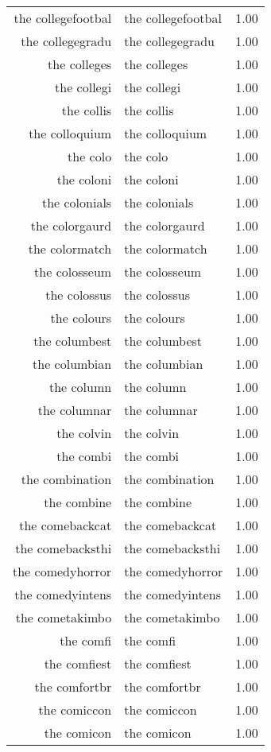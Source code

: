 \begin{table}[ht]
\begin{tabular}{rlr}
  the collegefootbal & the collegefootbal & 1.00 \\ 
  the collegegradu & the collegegradu & 1.00 \\ 
  the colleges & the colleges & 1.00 \\ 
  the collegi & the collegi & 1.00 \\ 
  the collis & the collis & 1.00 \\ 
  the colloquium & the colloquium & 1.00 \\ 
  the colo & the colo & 1.00 \\ 
  the coloni & the coloni & 1.00 \\ 
  the colonials & the colonials & 1.00 \\ 
  the colorgaurd & the colorgaurd & 1.00 \\ 
  the colormatch & the colormatch & 1.00 \\ 
  the colosseum & the colosseum & 1.00 \\ 
  the colossus & the colossus & 1.00 \\ 
  the colours & the colours & 1.00 \\ 
  the columbest & the columbest & 1.00 \\ 
  the columbian & the columbian & 1.00 \\ 
  the column & the column & 1.00 \\ 
  the columnar & the columnar & 1.00 \\ 
  the colvin & the colvin & 1.00 \\ 
  the combi & the combi & 1.00 \\ 
  the combination & the combination & 1.00 \\ 
  the combine & the combine & 1.00 \\ 
  the comebackcat & the comebackcat & 1.00 \\ 
  the comebacksthi & the comebacksthi & 1.00 \\ 
  the comedyhorror & the comedyhorror & 1.00 \\ 
  the comedyintens & the comedyintens & 1.00 \\ 
  the cometakimbo & the cometakimbo & 1.00 \\ 
  the comfi & the comfi & 1.00 \\ 
  the comfiest & the comfiest & 1.00 \\ 
  the comfortbr & the comfortbr & 1.00 \\ 
  the comiccon & the comiccon & 1.00 \\ 
  the comicon & the comicon & 1.00 \\ 

\end{tabular}
\end{table}
